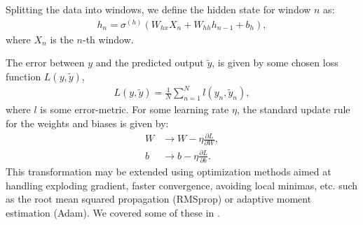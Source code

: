 \documentclass[%
reprint,
amsmath,amssymb,
aps,
]{revtex4-2}
\begin{document}
Splitting the data into windows, we define the hidden state for window \(n\) as:
\begin{align}
	h_{n} = \sigma^{(h)}\left( W_{hx}X_{n} + W_{hh}h_{n-1} + b_{h} \right),
\end{align}
where \(X_{n}\) is the \(n\)-th window.

The error between \(y\) and the predicted output \(\tilde{y}\), is given by some chosen loss function \(L(y, \tilde{y})\),
\begin{align}	
	L(y,\tilde{y}) = \frac{1}{N}\sum\limits_{n=1}^{N} l(y_{n}, \tilde{y}_n),
\end{align}
where \(l\) is some error-metric. 
For some learning rate \(\eta\), the standard update rule for the weights and biases is given by:
\begin{subequations}
\begin{align}
	W&\rightarrow W - \eta \frac{\partial L}{\partial W},  \\
	b&\rightarrow b - \eta \frac{\partial L}{\partial b}.
\end{align}
\end{subequations}
This transformation may be extended using optimization methods aimed at handling exploding gradient, faster convergence, avoiding local minimas, etc. such as the root mean squared propagation (RMSprop) or adaptive moment estimation (Adam). We covered some of these in \cite{project2}.
\end{document}
